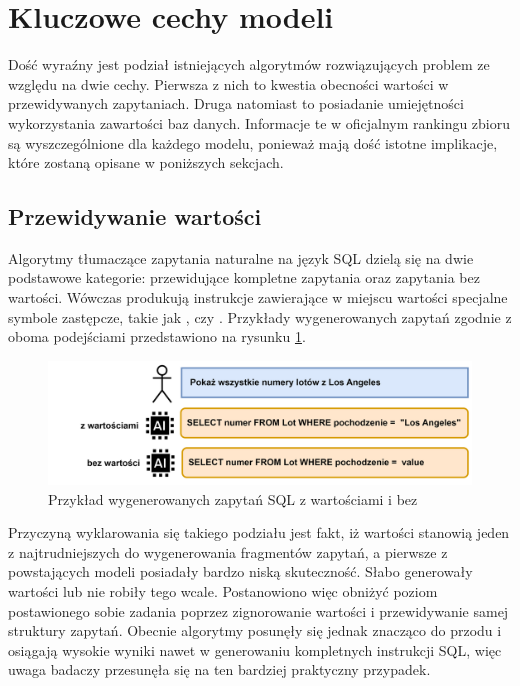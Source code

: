 \section{Kluczowe cechy modeli}
Dość wyraźny jest podział istniejących algorytmów rozwiązujących problem  ze względu na dwie cechy. Pierwsza z nich to kwestia obecności wartości w przewidywanych zapytaniach. Druga natomiast to posiadanie umiejętności wykorzystania zawartości baz danych. Informacje te w oficjalnym rankingu zbioru  są wyszczególnione dla każdego modelu, ponieważ mają dość istotne implikacje, które zostaną opisane w poniższych sekcjach.

\subsection{Przewidywanie wartości}
Algorytmy tłumaczące zapytania naturalne na język SQL dzielą się na dwie podstawowe kategorie: przewidujące kompletne zapytania oraz zapytania bez wartości. Wówczas produkują instrukcje zawierające w miejscu wartości specjalne symbole zastępcze, takie jak , czy . Przykłady wygenerowanych zapytań zgodnie z oboma podejściami przedstawiono na rysunku \ref{fig:query-values}.

\begin{figure}[ht!]
  \centering
  \includegraphics[width=1.0\linewidth]{images/query_values.png}
  \caption{Przykład wygenerowanych zapytań SQL z wartościami i bez}
  \label{fig:query-values}
\end{figure}

Przyczyną wyklarowania się takiego podziału jest fakt, iż wartości stanowią jeden z najtrudniejszych do wygenerowania fragmentów zapytań, a pierwsze z powstających modeli posiadały bardzo niską skuteczność. Słabo generowały wartości lub nie robiły tego wcale. Postanowiono więc obniżyć poziom postawionego sobie zadania poprzez zignorowanie wartości i przewidywanie samej struktury zapytań. Obecnie algorytmy posunęły się jednak znacząco do przodu i osiągają wysokie wyniki nawet w generowaniu kompletnych instrukcji SQL, więc uwaga badaczy przesunęła się na ten bardziej praktyczny przypadek.

